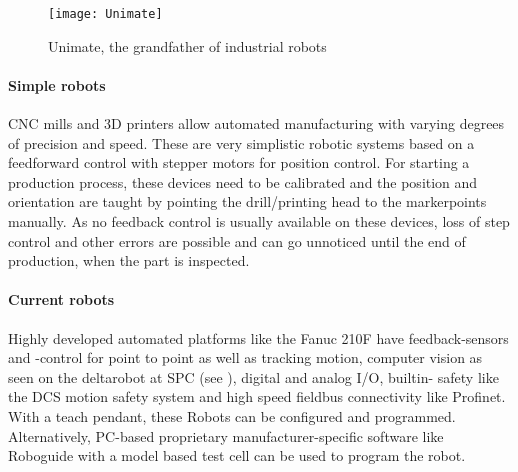 \begin{figure}[H]
	\texttt{[image: Unimate]}
	\caption{Unimate, the grandfather of industrial robots \cite{UnimateIEEE}  }
	\label{fig:Unimate}
\end{figure}
\medskip



\paragraph{Simple robots}
CNC mills and 3D printers allow automated manufacturing with varying degrees of precision and speed.
These are very simplistic robotic systems based on a feedforward control with stepper motors for position control. 
For starting a production process, these devices need to be calibrated and the position and orientation are taught by pointing the drill/printing head to the markerpoints manually. 
As no feedback control is usually available on these devices, loss of step control and other errors are possible and can go unnoticed until the end of production, when the part is inspected.
\medskip


\paragraph{Current robots}
Highly developed automated platforms like the Fanuc 210F have feedback-sensors and -control for point to point as well as tracking motion, computer vision as seen on the deltarobot at \ac{SPC} (see ), digital and analog I/O,  builtin- safety like the \ac{DCS} motion safety system and high speed fieldbus connectivity like Profinet.
With a teach pendant, these Robots can be configured and programmed. Alternatively, \ac{PC}-based proprietary manufacturer-specific software like Roboguide with a model based test cell can be used to program the robot. 
\medskip

